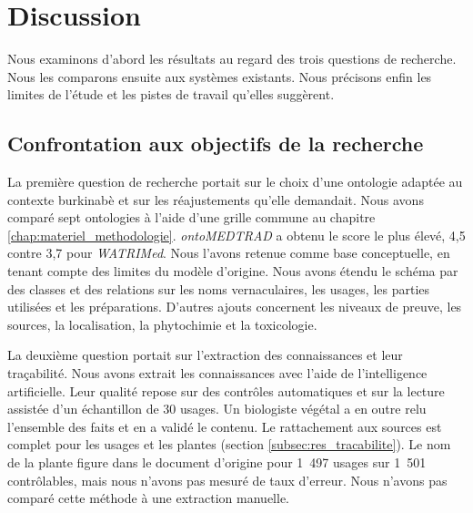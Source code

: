 
\section{Discussion}
\label{sec:discussion}

Nous examinons d'abord les résultats au regard des trois questions de recherche. Nous les comparons ensuite aux systèmes existants. Nous précisons enfin les limites de l'étude et les pistes de travail qu'elles suggèrent.

\subsection{Confrontation aux objectifs de la recherche}
\label{subsec:discussion_objectifs}

La première question de recherche portait sur le choix d'une ontologie adaptée au contexte burkinabè et sur les réajustements qu'elle demandait. Nous avons comparé sept ontologies à l'aide d'une grille commune au chapitre \ref{chap:materiel_methodologie}. \textit{ontoMEDTRAD} a obtenu le score le plus élevé, 4,5 contre 3,7 pour \textit{WATRIMed}. Nous l'avons retenue comme base conceptuelle, en tenant compte des limites du modèle d'origine. Nous avons étendu le schéma par des classes et des relations sur les noms vernaculaires, les usages, les parties utilisées et les préparations. D'autres ajouts concernent les niveaux de preuve, les sources, la localisation, la phytochimie et la toxicologie.

La deuxième question portait sur l'extraction des connaissances et leur traçabilité. Nous avons extrait les connaissances avec l'aide de l'intelligence artificielle. Leur qualité repose sur des contrôles automatiques et sur la lecture assistée d'un échantillon de 30 usages. Un biologiste végétal a en outre relu l'ensemble des faits et en a validé le contenu. Le rattachement aux sources est complet pour les usages et les plantes (section \ref{subsec:res_tracabilite}). Le nom de la plante figure dans le document d'origine pour 1~497 usages sur 1~501 contrôlables, mais nous n'avons pas mesuré de taux d'erreur. Nous n'avons pas comparé cette méthode à une extraction manuelle.

